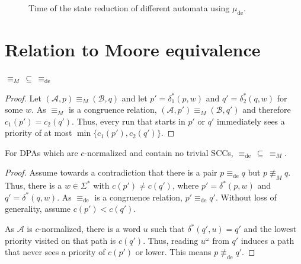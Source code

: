 \begin{figure}
\begin{minipage}{0.49\textwidth}
		\caption{Time of the state reduction of different automata using $\mu_\text{de}$.}
		\label{fig:fritzwilke:empirical_runtime}
	\end{minipage}
\end{figure}



\section{Relation to Moore equivalence}
\begin{lem}
	$\equiv_M \,\subseteq\, \equiv_\text{de}$
\end{lem}

\begin{proof}
	Let $(\mathcal{A}, p) \equiv_M (\mathcal{B}, q)$ and let $p' = \delta_1^*(p, w)$ and $q' = \delta_2^*(q, w)$ for some $w$. As $\equiv_M$ is a congruence relation, $(\mathcal{A}, p') \equiv_M (\mathcal{B}, q')$ and therefore $c_1(p') = c_2(q')$. Thus, every run that starts in $p'$ or $q'$ immediately sees a priority of at most $\min \{c_1(p'), c_2(q')\}$.
\end{proof}


\begin{lem}
	For DPAs which are $c$-normalized and contain no trivial SCCs, $\equiv_\text{de} \,\subseteq\, \equiv_M$.
\end{lem}

\begin{proof}
	Assume towards a contradiction that there is a pair $p \equiv_\text{de} q$ but $p \not\equiv_M q$. Thus, there is a $w \in \Sigma^*$ with $c(p') \neq c(q')$, where $p' = \delta^*(p, w)$ and $q' = \delta^*(q, w)$. As $\equiv_\text{de}$ is a congruence relation, $p' \equiv_\text{de} q'$. Without loss of generality, assume $c(p') < c(q')$.
	
	As $\mathcal{A}$ is $c$-normalized, there is a word $u$ such that $\delta^*(q', u) = q'$ and the lowest priority visited on that path is $c(q')$. Thus, reading $u^\omega$ from $q'$ induces a path that never sees a priority of $c(p')$ or lower. This means $p \not\equiv_\text{de} q'$.
\end{proof}


